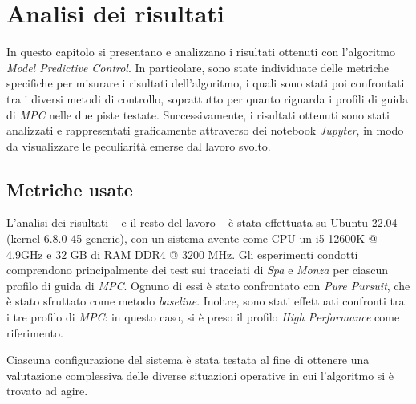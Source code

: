 \chapter{Analisi dei risultati}
\label{chap:chap5}
In questo capitolo si presentano e analizzano i risultati ottenuti con 
l'algoritmo \textit{Model Predictive Control}. In particolare, sono state individuate
delle metriche specifiche per misurare i risultati dell'algoritmo, i quali sono stati 
poi confrontati tra i diversi metodi di controllo, soprattutto per quanto riguarda
i profili di guida di \textit{MPC} nelle due piste testate.
Successivamente, i risultati ottenuti sono stati analizzati e rappresentati graficamente 
attraverso dei notebook \textit{Jupyter}, in modo da visualizzare le peculiarità emerse dal 
lavoro svolto.

\section{Metriche usate}
\label{subs:metrics}
L'analisi dei risultati -- e il resto del lavoro -- è stata effettuata su 
Ubuntu 22.04 (kernel 6.8.0-45-generic), con un sistema avente 
come CPU un i5-12600K @ 4.9GHz e 32 GB di RAM DDR4 @ 3200 MHz.
Gli esperimenti condotti comprendono principalmente dei test sui tracciati 
di \textit{Spa} e \textit{Monza} per ciascun profilo di guida di \textit{MPC}. Ognuno di essi è stato
confrontato con \textit{Pure Pursuit}, che è stato sfruttato come metodo
\textit{baseline}. Inoltre, sono stati effettuati confronti tra i tre profilo di \textit{MPC}:
in questo caso, si è preso il profilo \textit{High Performance} come riferimento. 

Ciascuna configurazione del 
sistema è stata testata al fine di ottenere una valutazione complessiva delle diverse situazioni 
operative in cui l'algoritmo si è trovato ad agire.

